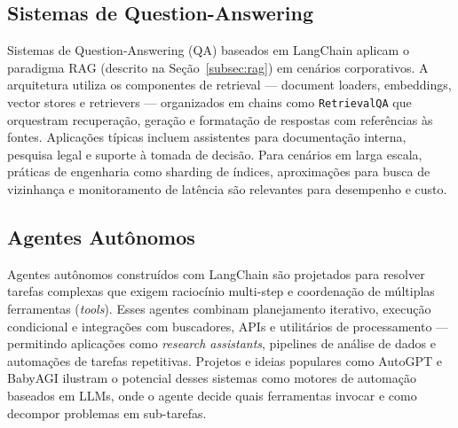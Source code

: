 \documentclass[12pt]{article}
\begin{document}
\subsection{Sistemas de Question-Answering}
\label{subsec:qa}


Sistemas de Question-Answering (QA) baseados em LangChain aplicam o paradigma RAG (descrito na Seção~\ref{subsec:rag}) em cenários corporativos. A arquitetura utiliza os componentes de retrieval — document loaders, embeddings, vector stores e retrievers — organizados em chains como \texttt{RetrievalQA} que orquestram recuperação, geração e formatação de respostas com referências às fontes. Aplicações típicas incluem assistentes para documentação interna, pesquisa legal e suporte à tomada de decisão. Para cenários em larga escala, práticas de engenharia como sharding de índices, aproximações para busca de vizinhança e monitoramento de latência são relevantes para desempenho e custo. \cite{langchain2023docs, lewis2020retrieval, reimers2019sentence, johnson2019billion}

\subsection{Agentes Autônomos}
\label{subsec:autonomous}

Agentes autônomos construídos com LangChain são projetados para resolver tarefas complexas que exigem raciocínio multi-step e coordenação de múltiplas ferramentas (\textit{tools}). Esses agentes combinam planejamento iterativo, execução condicional e integrações com buscadores, APIs e utilitários de processamento — permitindo aplicações como \textit{research assistants}, pipelines de análise de dados e automações de tarefas repetitivas. Projetos e ideias populares como AutoGPT e BabyAGI ilustram o potencial desses sistemas como motores de automação baseados em LLMs, onde o agente decide quais ferramentas invocar e como decompor problemas em sub-tarefas. \cite{yao2023react, wei2022chain, langchain2023docs}
\end{document}
